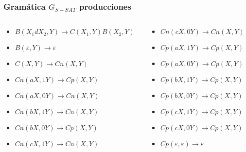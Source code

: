 \documentclass{beamer}
\begin{document}
\begin{frame}
    \frametitle{Gramática $G_{S-SAT}$ producciones}

    \begin{columns}
        \begin{column}{0.5\textwidth}
            \begin{itemize}
                \item $B(X_1dX_2,Y)\to C(X_1,Y) B(X_2,Y)$
                \item $B(\varepsilon,Y)\to\varepsilon$

                \item $C(X,Y)\to Cn(X,Y)$

                \item $Cn(aX,1Y) \to Cp(X,Y)$
                \item $Cn(aX,0Y) \to Cn(X,Y)$
                \item $Cn(bX,1Y) \to Cn(X,Y)$
                \item $Cn(bX,0Y) \to Cp(X,Y)$
                \item $Cn(cX,1Y) \to Cn(X,Y)$

            \end{itemize}
        \end{column}
        \begin{column}{0.5\textwidth}
            \begin{itemize}
                \item $Cn(cX,0Y) \to Cn(X,Y)$
                \item $Cp(aX,1Y) \to Cp(X,Y)$
                \item $Cp(aX,0Y) \to Cp(X,Y)$
                \item $Cp(bX,1Y) \to Cp(X,Y)$
                \item $Cp(bX,0Y) \to Cp(X,Y)$
                \item $Cp(cX,1Y) \to Cp(X,Y)$
                \item $Cp(cX,0Y) \to Cp(X,Y)$
                \item $Cp(\varepsilon,\varepsilon)\to \varepsilon$
            \end{itemize}
        \end{column}

    \end{columns}

\end{frame}
\end{document}

